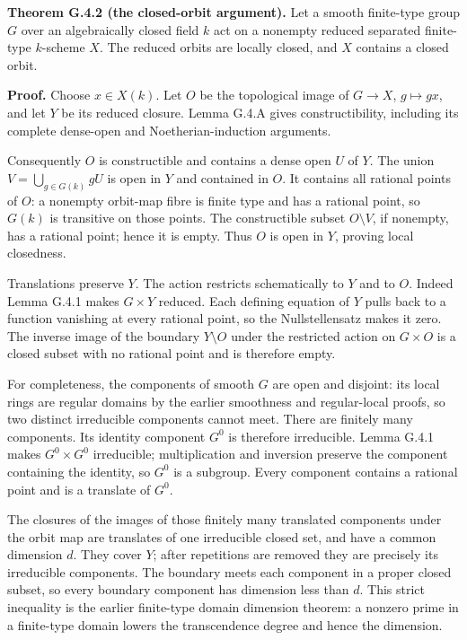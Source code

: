 \documentclass[11pt,a4paper,openany]{report}
\newcounter{none}
\begin{document}
\textbf{Theorem G.4.2 (the closed-orbit argument).} Let a smooth finite-type group \(G\) over an algebraically closed field \(k\) act on a nonempty reduced separated finite-type \(k\)-scheme \(X\). The reduced orbits are locally closed, and \(X\) contains a closed orbit.

\textbf{Proof.} Choose \(x\in X(k)\). Let \(O\) be the topological image of \(G\to X\), \(g\mapsto gx\), and let \(Y\) be its reduced closure. Lemma G.4.A gives constructibility, including its complete dense-open and Noetherian-induction arguments.

Consequently \(O\) is constructible and contains a dense open \(U\) of \(Y\). The union \(V=\bigcup_{g\in G(k)}gU\) is open in \(Y\) and contained in \(O\). It contains all rational points of \(O\): a nonempty orbit-map fibre is finite type and has a rational point, so \(G(k)\) is transitive on those points. The constructible subset \(O\setminus V\), if nonempty, has a rational point; hence it is empty. Thus \(O\) is open in \(Y\), proving local closedness.

Translations preserve \(Y\). The action restricts schematically to \(Y\) and to \(O\). Indeed Lemma G.4.1 makes \(G\times Y\) reduced. Each defining equation of \(Y\) pulls back to a function vanishing at every rational point, so the Nullstellensatz makes it zero. The inverse image of the boundary \(Y\setminus O\) under the restricted action on \(G\times O\) is a closed subset with no rational point and is therefore empty.

For completeness, the components of smooth \(G\) are open and disjoint: its local rings are regular domains by the earlier smoothness and regular-local proofs, so two distinct irreducible components cannot meet. There are finitely many components. Its identity component \(G^0\) is therefore irreducible. Lemma G.4.1 makes \(G^0\times G^0\) irreducible; multiplication and inversion preserve the component containing the identity, so \(G^0\) is a subgroup. Every component contains a rational point and is a translate of \(G^0\).

The closures of the images of those finitely many translated components under the orbit map are translates of one irreducible closed set, and have a common dimension \(d\). They cover \(Y\); after repetitions are removed they are precisely its irreducible components. The boundary meets each component in a proper closed subset, so every boundary component has dimension less than \(d\). This strict inequality is the earlier finite-type domain dimension theorem: a nonzero prime in a finite-type domain lowers the transcendence degree and hence the dimension.
\end{document}

